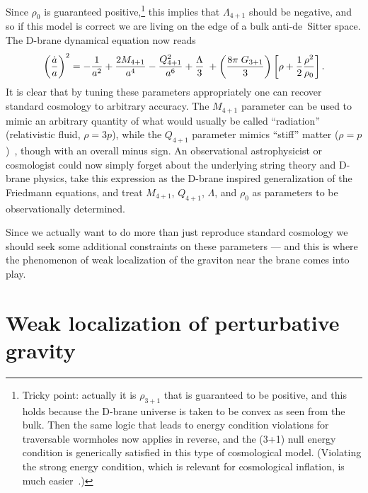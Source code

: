 \documentclass[a4paper,12pt]{article}
\begin{document}
Since $\rho_0$ is guaranteed positive,\footnote{
Tricky point: actually it is $\rho_{3+1}$ that is guaranteed to be
positive, and this holds because the D-brane universe is taken to be
convex as seen from the bulk. Then the same logic that leads to energy
condition violations for traversable wormholes now applies in reverse,
and the (3+1) null energy condition is generically satisfied in this
type of cosmological model. (Violating the strong energy condition,
which is relevant for cosmological inflation, is much
easier~\cite{Science}.)}
this implies that $\Lambda_{4+1}$ should be negative, and so if this
model is correct we are living on the edge of a bulk anti-de~Sitter
space. The D-brane dynamical equation now reads
%
\begin{equation}
\left({\dot a \over a}\right)^2 = 
- {1\over a^2} 
+ {2M_{4+1}\over a^4} 
-  {Q_{4+1}^2\over a^6} 
+ {\Lambda\over 3}\;
+\left({ 8\pi \; G_{3+1}\over3}\right) 
\left[\rho + {1\over2} {\rho^2\over\rho_0} \right]. 
\end{equation}
%
It is clear that by tuning these parameters appropriately one can
recover standard cosmology to arbitrary accuracy. The $M_{4+1}$
parameter can be used to mimic an arbitrary quantity of what would
usually be called ``radiation'' (relativistic fluid, $\rho=3p$), while
the $Q_{4+1}$ parameter mimics ``stiff'' matter
($\rho=p$)~\cite{Science}, though with an overall minus sign. An
observational astrophysicist or cosmologist could now simply forget
about the underlying string theory and D-brane physics, take this
expression as the D-brane inspired generalization of the Friedmann
equations, and treat $M_{4+1}$, $Q_{4+1}$, $\Lambda$, and $\rho_0$ as
parameters to be observationally determined.

Since we actually want to do more than just reproduce standard
cosmology we should seek some additional constraints on these
parameters --- and this is where the phenomenon of weak localization
of the graviton near the brane comes into play.


\section{Weak localization of perturbative gravity}
\label{S:weak}
\end{document}
